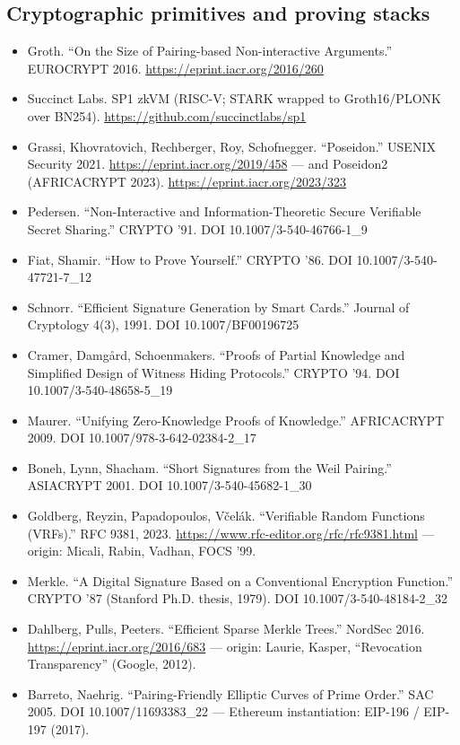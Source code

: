 \documentclass[11pt,a4paper]{article}
\begin{document}
\subsection*{Cryptographic primitives and proving stacks}
\begin{itemize}
    \item Groth. ``On the Size of Pairing-based Non-interactive Arguments.'' EUROCRYPT 2016. \url{https://eprint.iacr.org/2016/260}
    \item Succinct Labs. SP1 zkVM (RISC-V; STARK wrapped to Groth16/PLONK over BN254). \url{https://github.com/succinctlabs/sp1}
    \item Grassi, Khovratovich, Rechberger, Roy, Schofnegger. ``Poseidon.'' USENIX Security 2021. \url{https://eprint.iacr.org/2019/458} --- and Poseidon2 (AFRICACRYPT 2023). \url{https://eprint.iacr.org/2023/323}
    \item Pedersen. ``Non-Interactive and Information-Theoretic Secure Verifiable Secret Sharing.'' CRYPTO '91. DOI 10.1007/3-540-46766-1\_9
    \item Fiat, Shamir. ``How to Prove Yourself.'' CRYPTO '86. DOI 10.1007/3-540-47721-7\_12
    \item Schnorr. ``Efficient Signature Generation by Smart Cards.'' Journal of Cryptology 4(3), 1991. DOI 10.1007/BF00196725
    \item Cramer, Damgård, Schoenmakers. ``Proofs of Partial Knowledge and Simplified Design of Witness Hiding Protocols.'' CRYPTO '94. DOI 10.1007/3-540-48658-5\_19
    \item Maurer. ``Unifying Zero-Knowledge Proofs of Knowledge.'' AFRICACRYPT 2009. DOI 10.1007/978-3-642-02384-2\_17
    \item Boneh, Lynn, Shacham. ``Short Signatures from the Weil Pairing.'' ASIACRYPT 2001. DOI 10.1007/3-540-45682-1\_30
    \item Goldberg, Reyzin, Papadopoulos, Včelák. ``Verifiable Random Functions (VRFs).'' RFC 9381, 2023. \url{https://www.rfc-editor.org/rfc/rfc9381.html} --- origin: Micali, Rabin, Vadhan, FOCS '99.
    \item Merkle. ``A Digital Signature Based on a Conventional Encryption Function.'' CRYPTO '87 (Stanford Ph.D. thesis, 1979). DOI 10.1007/3-540-48184-2\_32
    \item Dahlberg, Pulls, Peeters. ``Efficient Sparse Merkle Trees.'' NordSec 2016. \url{https://eprint.iacr.org/2016/683} --- origin: Laurie, Kasper, ``Revocation Transparency'' (Google, 2012).
    \item Barreto, Naehrig. ``Pairing-Friendly Elliptic Curves of Prime Order.'' SAC 2005. DOI 10.1007/11693383\_22 --- Ethereum instantiation: EIP-196 / EIP-197 (2017).
\end{itemize}
\end{document}
